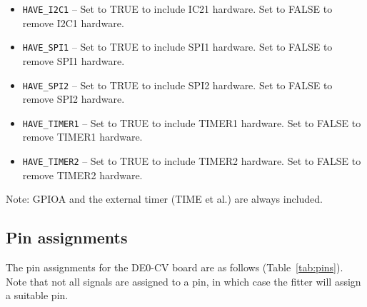 \documentclass[12pt]{article}
\begin{document}
\begin{itemize}
\item \lstinline|HAVE_I2C1| -- Set to TRUE to include IC21 hardware. Set to FALSE to remove I2C1 hardware.
\item \lstinline|HAVE_SPI1| -- Set to TRUE to include SPI1 hardware. Set to FALSE to remove SPI1 hardware.
\item \lstinline|HAVE_SPI2| -- Set to TRUE to include SPI2 hardware. Set to FALSE to remove SPI2 hardware.
\item \lstinline|HAVE_TIMER1| -- Set to TRUE to include TIMER1 hardware. Set to FALSE to remove TIMER1 hardware.
\item \lstinline|HAVE_TIMER2| -- Set to TRUE to include TIMER2 hardware. Set to FALSE to remove TIMER2 hardware.
\end{itemize}

Note: GPIOA and the external timer (TIME et al.) are always included.


\subsection{Pin assignments}
The pin assignments for the DE0-CV board are as follows (Table~\ref{tab:pins}). Note that not all signals are assigned to a pin, in which case the fitter will assign a suitable pin.
\end{document}
